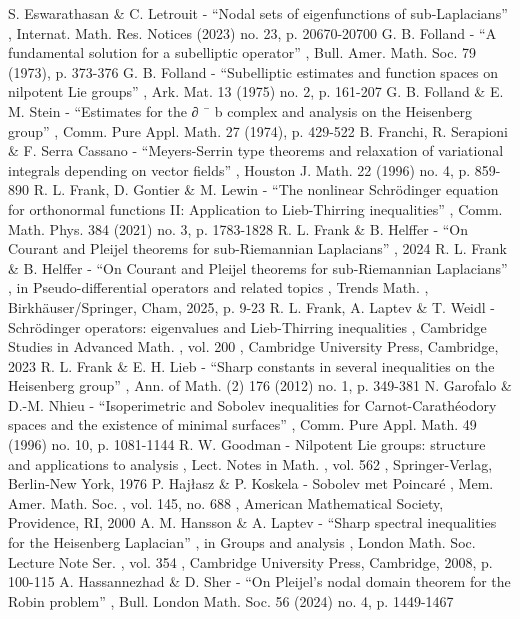  S. Eswarathasan \& C. Letrouit - “Nodal sets of eigenfunctions of sub-Laplacians” , Internat. Math. Res. Notices (2023) no. 23, p. 20670-20700
 G. B. Folland - “A fundamental solution for a subelliptic operator” , Bull. Amer. Math. Soc. 79 (1973), p. 373-376
 G. B. Folland - “Subelliptic estimates and function spaces on nilpotent Lie groups” , Ark. Mat. 13 (1975) no. 2, p. 161-207
 G. B. Folland \& E. M. Stein - “Estimates for the ∂ ¯ b complex and analysis on the Heisenberg group” , Comm. Pure Appl. Math. 27 (1974), p. 429-522
 B. Franchi, R. Serapioni \& F. Serra Cassano - “Meyers-Serrin type theorems and relaxation of variational integrals depending on vector fields” , Houston J. Math. 22 (1996) no. 4, p. 859-890
 R. L. Frank, D. Gontier \& M. Lewin - “The nonlinear Schrödinger equation for orthonormal functions II: Application to Lieb-Thirring inequalities” , Comm. Math. Phys. 384 (2021) no. 3, p. 1783-1828
 R. L. Frank \& B. Helffer - “On Courant and Pleijel theorems for sub-Riemannian Laplacians” , 2024
 R. L. Frank \& B. Helffer - “On Courant and Pleijel theorems for sub-Riemannian Laplacians” , in Pseudo-differential operators and related topics , Trends Math. , Birkhäuser/Springer, Cham, 2025, p. 9-23
 R. L. Frank, A. Laptev \& T. Weidl - Schrödinger operators: eigenvalues and Lieb-Thirring inequalities , Cambridge Studies in Advanced Math. , vol. 200 , Cambridge University Press, Cambridge, 2023
 R. L. Frank \& E. H. Lieb - “Sharp constants in several inequalities on the Heisenberg group” , Ann. of Math. (2) 176 (2012) no. 1, p. 349-381
 N. Garofalo \& D.-M. Nhieu - “Isoperimetric and Sobolev inequalities for Carnot-Carathéodory spaces and the existence of minimal surfaces” , Comm. Pure Appl. Math. 49 (1996) no. 10, p. 1081-1144
 R. W. Goodman - Nilpotent Lie groups: structure and applications to analysis , Lect. Notes in Math. , vol. 562 , Springer-Verlag, Berlin-New York, 1976
 P. Hajłasz \& P. Koskela - Sobolev met Poincaré , Mem. Amer. Math. Soc. , vol. 145, no. 688 , American Mathematical Society, Providence, RI, 2000
 A. M. Hansson \& A. Laptev - “Sharp spectral inequalities for the Heisenberg Laplacian” , in Groups and analysis , London Math. Soc. Lecture Note Ser. , vol. 354 , Cambridge University Press, Cambridge, 2008, p. 100-115
 A. Hassannezhad \& D. Sher - “On Pleijel’s nodal domain theorem for the Robin problem” , Bull. London Math. Soc. 56 (2024) no. 4, p. 1449-1467

